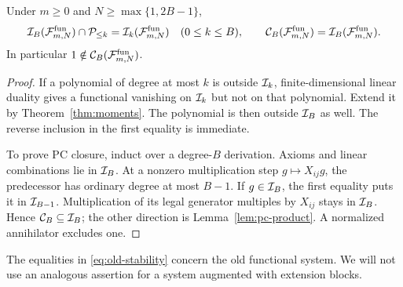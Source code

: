\begin{corollary}\label{cor:stability}
Under \(m\ge0\) and \(N\ge\max\{1,2B-1\}\),
\begin{equation}\label{eq:old-stability}
 \mathcal I_B(\mathcal F^{\mathrm{fun}}_{m,N})\cap\mathcal P_{\le k}
       =\mathcal I_k(\mathcal F^{\mathrm{fun}}_{m,N})
       \quad(0\le k\le B),
 \qquad
 \mathcal C_B(\mathcal F^{\mathrm{fun}}_{m,N})
       =\mathcal I_B(\mathcal F^{\mathrm{fun}}_{m,N}).
\end{equation}
In particular \(1\notin\mathcal C_B(\mathcal F^{\mathrm{fun}}_{m,N})\).
\end{corollary}
\begin{proof}
If a polynomial of degree at most \(k\) is outside \(\mathcal I_k\),
finite-dimensional linear duality gives a functional vanishing on
\(\mathcal I_k\) but not on that polynomial. Extend it by
Theorem~\ref{thm:moments}. The polynomial is then outside \(\mathcal I_B\)
as well. The reverse inclusion in the first equality is immediate.

To prove PC closure, induct over a degree-\(B\) derivation.
Axioms and linear combinations lie in \(\mathcal I_B\).
At a nonzero multiplication step \(g\mapsto X_{ij}g\), the predecessor
has ordinary degree at most \(B-1\). If \(g\in\mathcal I_B\), the first
equality puts it in \(\mathcal I_{B-1}\). Multiplication of its legal
generator multiples by \(X_{ij}\) stays in \(\mathcal I_B\).
Hence \(\mathcal C_B\subseteq\mathcal I_B\); the other direction is
Lemma~\ref{lem:pc-product}.
A normalized annihilator excludes one.
\end{proof}

The equalities in \eqref{eq:old-stability} concern the old functional
system. We will not use an analogous assertion for a system augmented
with extension blocks.
